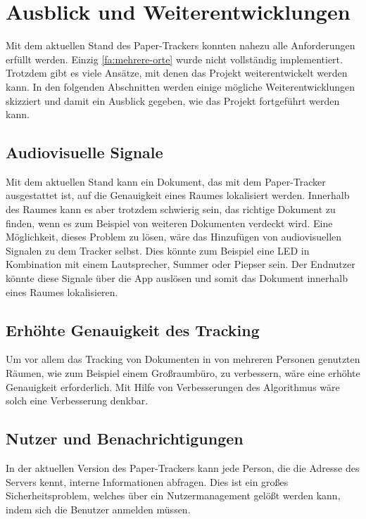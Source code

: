 \chapter{Ausblick und Weiterentwicklungen}

Mit dem aktuellen Stand des Paper-Trackers konnten nahezu alle Anforderungen erfüllt werden. Einzig \ref*{fa:mehrere-orte} wurde nicht vollständig implementiert.
Trotzdem gibt es viele Ansätze, mit denen das Projekt weiterentwickelt werden kann.
In den folgenden Abschnitten werden einige mögliche Weiterentwicklungen skizziert und damit ein Ausblick gegeben,
wie das Projekt fortgeführt werden kann.

\section{Audiovisuelle Signale}

Mit dem aktuellen Stand kann ein Dokument, das mit dem Paper-Tracker ausgestattet ist, auf die Genauigkeit eines Raumes
lokalisiert werden.
Innerhalb des Raumes kann es aber trotzdem schwierig sein, das richtige Dokument zu finden, wenn es zum Beispiel von
weiteren Dokumenten verdeckt wird.
Eine Möglichkeit, dieses Problem zu lösen, wäre das Hinzufügen von audiovisuellen Signalen zu dem Tracker selbst.
Dies könnte zum Beispiel eine \gls{LED} in Kombination mit einem Lautsprecher, Summer oder Piepser sein.
Der Endnutzer könnte diese Signale über die App auslösen und somit das Dokument innerhalb eines Raumes lokalisieren.

\section{Erhöhte Genauigkeit des Tracking}

Um vor allem das Tracking von Dokumenten in von mehreren Personen genutzten Räumen, wie zum Beispiel einem Großraumbüro,
zu verbessern, wäre eine erhöhte Genauigkeit erforderlich.
Mit Hilfe von Verbesserungen des Algorithmus wäre solch eine Verbesserung denkbar.

\section{Nutzer und Benachrichtigungen}

In der aktuellen Version des Paper-Trackers kann jede Person, die die Adresse des Servers kennt, interne Informationen
abfragen.
Dies ist ein großes Sicherheitsproblem, welches über ein Nutzermanagement gelößt werden kann, indem sich die Benutzer
anmelden müssen.

